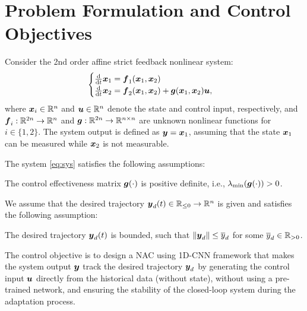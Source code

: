 \documentclass[letterpaper, journal]{IEEEtran}
\begin{document}
\section{Problem Formulation and Control Objectives} \label{sec:problem_formulation}

Consider the 2nd order affine strict feedback nonlinear system:
\begin{equation} \label{eq:sys}
  \begin{cases}
    \tfrac{\mathrm d}{\mathrm d t}\boldsymbol{x}_1
    =
    \boldsymbol{f}_1(\boldsymbol{x}_1, \boldsymbol{x}_2)
    \\
    \tfrac{\mathrm d}{\mathrm d t}\boldsymbol{x}_2
    =
    \boldsymbol{f}_2(\boldsymbol{x}_1, \boldsymbol{x}_2)
    +
    \boldsymbol{g}(\boldsymbol{x}_1, \boldsymbol{x}_2) \boldsymbol{u}
    ,
  \end{cases}
\end{equation}
where $\boldsymbol{x}_i \in \mathbb{R}^n$ and $\boldsymbol{u} \in \mathbb{R}^n$ denote the state and control input, respectively, and $\boldsymbol{f}_i: \mathbb{R}^{2n} \to \mathbb{R}^n$ and $\boldsymbol{g}: \mathbb{R}^{2n} \to \mathbb{R}^{n\times n}$ are unknown nonlinear functions for $i \in \{1,2\}$.
The system output is defined as $\boldsymbol{y} = \boldsymbol{x}_1$, assuming that the state $\boldsymbol{x}_1$ can be measured while $\boldsymbol{x}_2$ is not measurable. 

The system \eqref{eq:sys} satisfies the following assumptions:
\begin{assum} \label{assum:B:positive}
  The control effectiveness matrix $\boldsymbol{g}(\cdot)$ is positive definite, i.e., $\lambda_{\min}(\boldsymbol{g}(\cdot)) > 0$.
\end{assum}


We assume that the desired trajectory $\boldsymbol{y}_d(t)\in\mathbb{R}_{\le0}\to\mathbb{R}^n$ is given and satisfies the following assumption:

\begin{assum} \label{assum:desired:y}
  The desired trajectory $\boldsymbol{y}_d(t)$ is bounded, such that $\lVert \boldsymbol{y}_d \rVert \le \overline{y}_d$ for some $\overline{y}_d \in \mathbb{R}_{>0}$.
\end{assum}

The control objective is to design a NAC using 1D-CNN framework that makes the system output $\boldsymbol{y}$ track the desired trajectory $\boldsymbol{y}_d$ by generating the control input $\boldsymbol{u}$ directly from the historical data (without state), without using a pre-trained network, and ensuring the stability of the closed-loop system during the adaptation process.
\end{document}
